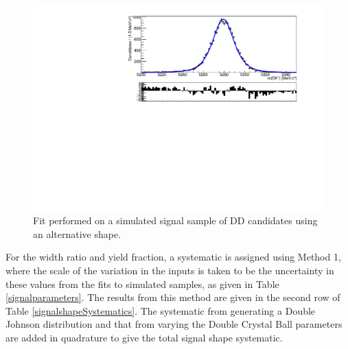 \begin{figure}[h]
\centering
\includegraphics[width=0.5\linewidth]{figures/fitComponents/signalShape_DD_KPi_Johnson.pdf}
\caption{Fit performed on a simulated signal sample of DD candidates using an alternative shape.}
\label{signalshapesys}
\end{figure}

For the width ratio and yield fraction, a systematic is assigned using Method 1, where the scale of the variation in the inputs is taken to be the uncertainty in these values from the fits to simulated samples, as given in Table \ref{signalparameters}. The results from this method are given in the second row of Table \ref{signalshapeSystematics}. The systematic from generating a Double Johnson distribution and that from varying the Double Crystal Ball parameters are added in quadrature to give the total signal shape systematic.

